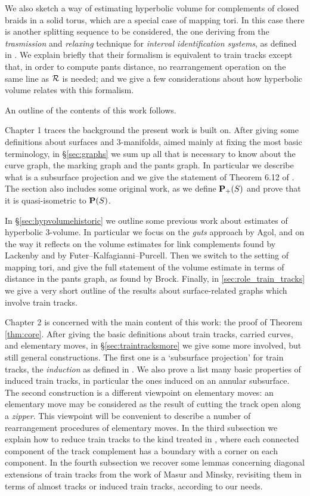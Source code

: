 We also sketch a way of estimating hyperbolic volume for complements of closed braids in a solid torus, which are a special case of mapping tori. In this case there is another splitting sequence to be considered, the one deriving from the \emph{trasmission} and \emph{relaxing} technique for \emph{interval identification systems}, as defined in \cite{dynnikovwiest}. We explain briefly that their formalism is equivalent to train tracks except that, in order to compute pants distance, no rearrangement operation on the same line as ${\mathcal R}$ is needed; and we give a few considerations about how hyperbolic volume relates with this formalism.

An outline of the contents of this work follows.

Chapter 1 traces the background the present work is built on. After giving some definitions about surfaces and 3-manifolds, aimed mainly at fixing the most basic terminology, in \S \ref{sec:graphs} we sum up all that is necessary to know about the curve graph, the marking graph and the pants graph. In particular we describe what is a subsurface projection and we give the statement of Theorem 6.12 of \cite{masurminskyii}. The section also includes some original work, as we define ${\mathbf{P}_+}(S)$ and prove that it is quasi-isometric to $\mathbf P(S)$.

In \S \ref{sec:hypvolumehistoric} we outline some previous work about estimates of hyperbolic 3-volume. In particular we focus on the \emph{guts} approach by Agol, and on the way it reflects on the volume estimates for link complements found by Lackenby and by Futer--Kalfagianni--Purcell. Then we switch to the setting of mapping tori, and give the full statement of the volume estimate in terms of distance in the pants graph, as found by Brock. Finally, in \ref{sec:role_train_tracks} we give a very short outline of the results about surface-related graphs which involve train tracks.

Chapter 2 is concerned with the main content of this work: the proof of Theorem \ref{thm:core}. After giving the basic definitions about train tracks, carried curves, and elementary moves, in \S \ref{sec:traintracksmore} we give some more involved, but still general constructions. The first one is a `subsurface projection' for train tracks, the \emph{induction} as defined in \cite{mms}. We also prove a list many basic properties of induced train tracks, in particular the ones induced on an annular subsurface. The second construction is a different viewpoint on elementary moves: an elementary move may be considered as the result of cutting the track open along a \emph{zipper}. This viewpoint will be convenient to describe a number of rearrangement procedures of elementary moves. In the third subsection we explain how to reduce train tracks to the kind treated in \cite{mms}, where each connected component of the track complement has a boundary with a corner on each component. In the fourth subsection we recover some lemmas concerning diagonal extensions of train tracks from the work of Masur and Minsky, revisiting them in terms of almost tracks or induced train tracks, according to our needs.

